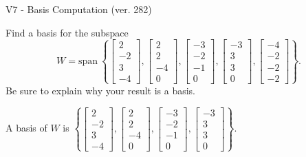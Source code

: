 \begin{exercise}
  \begin{exerciseTitle}V7 - Basis Computation (ver. 282)\end{exerciseTitle}
  \begin{exerciseStatement}
    Find a basis for the subspace 
\[W=\mathrm{span}\ \left\{\left[\begin{array}{r}
2 \\
-2 \\
3 \\
-4
\end{array}\right] , \left[\begin{array}{r}
2 \\
2 \\
-4 \\
0
\end{array}\right] , \left[\begin{array}{r}
-3 \\
-2 \\
-1 \\
0
\end{array}\right] , \left[\begin{array}{r}
-3 \\
3 \\
3 \\
0
\end{array}\right] , \left[\begin{array}{r}
-4 \\
-2 \\
-2 \\
-2
\end{array}\right]\right\}.\]
 Be sure to explain why your result is a basis.


  \end{exerciseStatement}
  \begin{exerciseAnswer}
   A basis of \(W\) is  \(\left\{\left[\begin{array}{r}
2 \\
-2 \\
3 \\
-4
\end{array}\right] , \left[\begin{array}{r}
2 \\
2 \\
-4 \\
0
\end{array}\right] , \left[\begin{array}{r}
-3 \\
-2 \\
-1 \\
0
\end{array}\right] , \left[\begin{array}{r}
-3 \\
3 \\
3 \\
0
\end{array}\right]\right\}\).
  


  \end{exerciseAnswer}
\end{exercise}